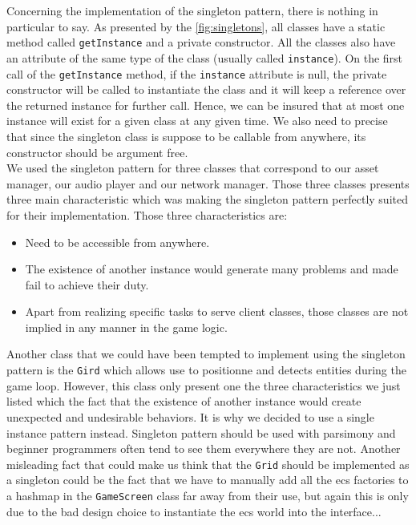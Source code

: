 
Concerning the implementation of the singleton pattern, there is nothing in particular to say. As presented by the \autoref{fig:singletons}, all classes have a static method called \texttt{getInstance} and a private constructor. All the classes also have an attribute of the same type of the class (usually called \texttt{instance}). On the first call of the \texttt{getInstance} method, if the \texttt{instance} attribute is null, the private constructor will be called to instantiate the class and it will keep a reference over the returned instance for further call. Hence, we can be insured that at most one instance will exist for a given class at any given time. We also need to precise that since the singleton class is suppose to be callable from anywhere, its constructor should be argument free. \\

We used the singleton pattern for three classes that correspond to our asset manager, our audio player and our network manager. Those three classes presents three main characteristic which was making the singleton pattern perfectly suited for their implementation. Those three characteristics are:
\begin{itemize}
  \item Need to be accessible from anywhere.
  \item The existence of another instance would generate many problems and made fail to achieve their duty.
  \item Apart from realizing specific tasks to serve client classes, those classes are not implied in any manner in the game logic.
\end{itemize}

Another class that we could have been tempted to implement using the singleton pattern is the \texttt{Gird} which allows use to positionne and detects entities during the game loop. However, this class only present one the three characteristics we just listed which the fact that the existence of another instance would create unexpected and undesirable behaviors. It is why we decided to use a single instance pattern instead. Singleton pattern should be used with parsimony and beginner programmers often tend to see them everywhere they are not. Another misleading fact that could make us think that the \texttt{Grid} should be implemented as a singleton could be the fact that we have to manually add all the \gls{ecs} factories to a hashmap in the \texttt{GameScreen} class far away from their use, but again this is only due to the bad design choice to instantiate the \gls{ecs} world into the interface... \\

